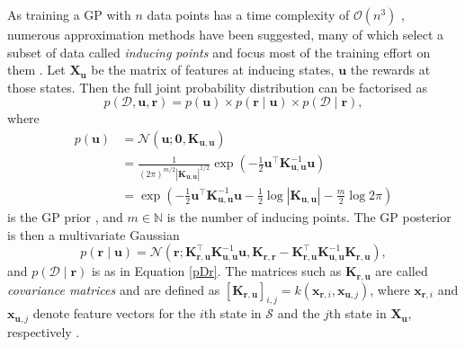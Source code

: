\documentclass{mpaper}
\newcommand{\Kuu}{\mathbf{K}_{\mathbf{u},\mathbf{u}}}
\newcommand{\Krr}{\mathbf{K}_{\mathbf{r},\mathbf{r}}}
\newcommand{\Kru}{\mathbf{K}_{\mathbf{r},\mathbf{u}}}
\newcommand{\pfull}{p(\mathcal{D}, \mathbf{u}, \mathbf{r})}
\begin{document}
As training a GP with $n$ data points has a time complexity of
$\mathcal{O}(n^3)$ \cite{DBLP:books/lib/RasmussenW06}, numerous approximation
methods have been suggested, many of which select a subset of data called
\emph{inducing points} and focus most of the training effort on them
\cite{DBLP:journals/corr/abs-1807-01065}. Let $\mathbf{X_u}$ be the matrix of
features at inducing states, $\mathbf{u}$ the rewards at those states. Then the
full joint probability distribution can be factorised as
\begin{equation} \label{eq:full}
  \pfull = p(\mathbf{u}) \times p(\mathbf{r} \mid \mathbf{u}) \times
  p(\mathcal{D} \mid \mathbf{r}),
\end{equation}
where
\begin{align*}
  p(\mathbf{u}) &= \mathcal{N}(\mathbf{u}; \mathbf{0}, \Kuu) \\
                &= \frac{1}{(2\pi)^{m/2}|\Kuu|^{1/2}}\exp \left( -\frac{1}{2} \mathbf{u}^\intercal\Kuu^{-1}\mathbf{u} \right) \\
                &= \exp\left(-\frac{1}{2}\mathbf{u}^\intercal\Kuu^{-1}\mathbf{u} - \frac{1}{2}\log|\Kuu| - \frac{m}{2}\log 2\pi\right)
\end{align*}
is the GP prior \cite{DBLP:books/lib/RasmussenW06}, and $m \in \mathbb{N}$ is
the number of inducing points. The GP posterior is then a multivariate Gaussian
\cite{DBLP:conf/nips/LevinePK11}
\begin{equation} \label{eq:r}
  p(\mathbf{r} \mid \mathbf{u}) =
  \mathcal{N}(\mathbf{r}; \Kru^\intercal\Kuu^{-1}\mathbf{u}, \Krr - \Kru^\intercal\Kuu^{-1}\Kru),
\end{equation}
and $p(\mathcal{D} \mid \mathbf{r})$ is as in Equation \ref{pDr}. The matrices such as
$\Kru$ are called \emph{covariance matrices} and are defined as
$[\Kru]_{i,j} = k(\mathbf{x}_{\mathbf{r},i},
\mathbf{x}_{\mathbf{u},j})$, where $\mathbf{x}_{\mathbf{r},i}$ and
$\mathbf{x}_{\mathbf{u},j}$ denote feature vectors for the $i$th state in
$\mathcal{S}$ and the $j$th state in $\mathbf{X_u}$, respectively
\cite{DBLP:conf/uai/JinDAS17}.
\end{document}
